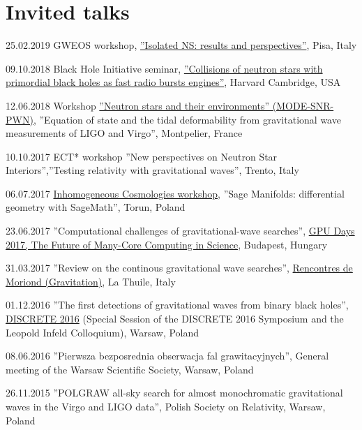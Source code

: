 \documentclass[]{friggeri-cv} %
\begin{document}
\section{Invited talks}
\begin{entrylistoc}

\entrys 
{25.02.2019} 
{{GWEOS workshop}, \href{https://agenda.infn.it/event/17643/timetable/\#20190225}{''Isolated NS: results and perspectives''}, {Pisa, Italy}} 

\entrys 
{09.10.2018} 
{{Black Hole Initiative seminar}, \href{https://arxiv.org/abs/1704.05931}{''Collisions of neutron stars with primordial black holes as fast radio bursts engines''}, {Harvard Cambridge, USA}} 

\entrys
{12.06.2018}
{{Workshop \href{https://mode2018.sciencesconf.org/program}{''Neutron stars and their environments'' (MODE-SNR-PWN)}}, {''Equation of state and the tidal deformability from gravitational wave measurements of LIGO and Virgo'', Montpelier, France}}

\entrys 
{10.10.2017} 
{{ECT* workshop ''New perspectives on Neutron Star Interiors''},{''Testing relativity with gravitational waves'', Trento, Italy}} 

\entrys
{06.07.2017} 
{\href{https://cosmo.torun.pl/cosmotorun17.html}{Inhomogeneous Cosmologies workshop}, ''Sage Manifolds: differential geometry with SageMath'', Torun, Poland} 

\entrys 
{23.06.2017}
{''Computational challenges of gravitational-wave searches'', \href{http://gpuday.com}{GPU Days 2017, The Future of Many-Core Computing in Science}, Budapest, Hungary} 

\entrys 
{31.03.2017}
{''Review on the continous gravitational wave searches'', \href{http://moriond.in2p3.fr/grav/2017/program.php\#Friday}{Rencontres de Moriond (Gravitation)}, La Thuile, Italy}

\entrys 
{01.12.2016}
{''The first detections of gravitational waves from binary black holes'', \href{http://indico.fuw.edu.pl/sessionDisplay.py?contribId=57\&sessionId=44\&confId=46\#20161201}{DISCRETE 2016} (Special Session of the DISCRETE 2016 Symposium and the Leopold Infeld Colloquium), Warsaw, Poland}

\entrys 
{08.06.2016} 
{''Pierwsza bezposrednia obserwacja fal grawitacyjnych'', General meeting of the Warsaw Scientific Society, Warsaw, Poland} 

\entrys
{26.11.2015}
{''POLGRAW all-sky search for almost monochromatic gravitational waves in the Virgo and LIGO data'', Polish Society on Relativity, Warsaw, Poland}




\end{entrylistoc}
\end{document}
